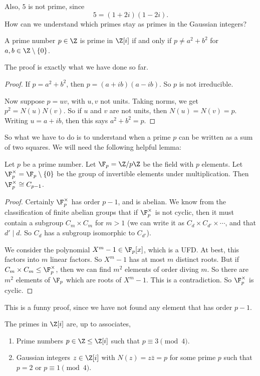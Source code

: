\documentclass[a4paper]{article}
\begin{document}
Also, $5$ is not prime, since
\[
  5 = (1 + 2i)(1 - 2i).
\]
How can we understand which primes stay as primes in the Gaussian integers?
\begin{prop}
  A prime number $p \in \Z$ is prime in $\Z[i]$ if and only if $p \not= a^2 + b^2$ for $a, b \in \Z \setminus \{0\}$.
\end{prop}
The proof is exactly what we have done so far.

\begin{proof}
  If $p = a^2 + b^2$, then $p = (a + ib)(a - ib)$. So $p$ is not irreducible.

  Now suppose $p = uv$, with $u, v$ not units. Taking norms, we get $p^2 = N(u) N(v)$. So if $u$ and $v$ are not units, then $N(u) = N(v) = p$. Writing $u = a + ib$, then this says $a^2 + b^2 = p$.
\end{proof}

So what we have to do is to understand when a prime $p$ can be written as a sum of two squares. We will need the following helpful lemma:

\begin{lemma}
  Let $p$ be a prime number. Let $\F_p = \Z/p\Z$ be the field with $p$ elements. Let $\F_p^\times = \F_p\setminus \{0\}$ be the group of invertible elements under multiplication. Then $\F_p^\times \cong C_{p - 1}$.
\end{lemma}

\begin{proof}
  Certainly $\F_p^\times$ has order $p - 1$, and is abelian. We know from the classification of finite abelian groups that if $\F_p^\times$ is not cyclic, then it must contain a subgroup $C_m \times C_m$ for $m > 1$ (we can write it as $C_d \times C_{d'} \times \cdots$, and that $d' \mid d$. So $C_d$ has a subgroup isomorphic to $C_{d'}$).

  We consider the polynomial $X^m - 1 \in \F_p[x]$, which is a UFD. At best, this factors into $m$ linear factors. So $X^m - 1$ has at most $m$ distinct roots. But if $C_m \times C_m \leq \F_p^\times$, then we can find $m^2$ elements of order diving $m$. So there are $m^2$ elements of $\F_p$ which are roots of $X^m - 1$. This is a contradiction. So $\F_p^\times$ is cyclic.
\end{proof}

This is a funny proof, since we have not found any element that has order $p - 1$.

\begin{prop}
  The primes in $\Z[i]$ are, up to associates,
  \begin{enumerate}
    \item Prime numbers $p \in \Z \leq \Z[i]$ such that $p\equiv 3 \pmod 4$.
    \item Gaussian integers $z \in \Z[i]$ with $N(z) = z\bar{z} = p$ for some prime $p$ such that $p = 2$ or $p \equiv 1 \pmod 4$.
  \end{enumerate}
\end{prop}
\end{document}
